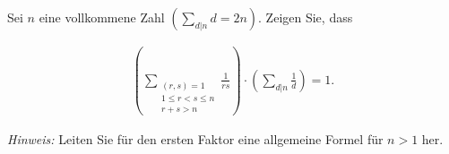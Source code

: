 
\begin{exercise}

Sei $n$ eine vollkommene Zahl $(\sum_{d|n} d = 2n)$. Zeigen Sie, dass

\begin{align*}
    \left( \sum_{\substack{(r,s) = 1 \\ 1 \leq r < s \leq n \\ r + s > n}} \frac{1}{rs}\right) \cdot
    \left( \sum_{d|n} \frac{1}{d}\right) = 1.
\end{align*}

\textit{Hinweis:} Leiten Sie für den ersten Faktor eine allgemeine Formel für $n > 1$ her.

\end{exercise}


\begin{solution}

\phantom{}

\end{solution}

